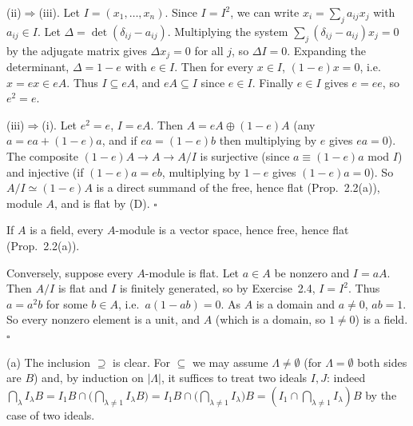 \documentclass[11pt]{article}
\begin{document}
(ii)$\Rightarrow$(iii). Let $I=(x_1,\dots,x_n)$. Since $I=I^2$, we can write $x_i=\sum_j a_{ij}x_j$ with $a_{ij}\in I$. Let $\Delta=\det(\delta_{ij}-a_{ij})$. Multiplying the system $\sum_j(\delta_{ij}-a_{ij})x_j=0$ by the adjugate matrix gives $\Delta x_j=0$ for all $j$, so $\Delta I=0$. Expanding the determinant, $\Delta=1-e$ with $e\in I$. Then for every $x\in I$, $(1-e)x=0$, i.e.\ $x=ex\in eA$. Thus $I\subseteq eA$, and $eA\subseteq I$ since $e\in I$. Finally $e\in I$ gives $e=ee$, so $e^2=e$.

(iii)$\Rightarrow$(i). Let $e^2=e$, $I=eA$. Then $A=eA\oplus(1-e)A$ (any $a=ea+(1-e)a$, and if $ea=(1-e)b$ then multiplying by $e$ gives $ea=0$). The composite $(1-e)A\to A\to A/I$ is surjective (since $a\equiv (1-e)a$ mod $I$) and injective (if $(1-e)a=eb$, multiplying by $1-e$ gives $(1-e)a=0$). So $A/I\simeq (1-e)A$ is a direct summand of the free, hence flat (Prop.~2.2(a)), module $A$, and is flat by (D). \hfill$\square$

\pf
If $A$ is a field, every $A$-module is a vector space, hence free, hence flat (Prop.~2.2(a)).

Conversely, suppose every $A$-module is flat. Let $a\in A$ be nonzero and $I=aA$. Then $A/I$ is flat and $I$ is finitely generated, so by Exercise~2.4, $I=I^2$. Thus $a=a^2b$ for some $b\in A$, i.e.\ $a(1-ab)=0$. As $A$ is a domain and $a\neq0$, $ab=1$. So every nonzero element is a unit, and $A$ (which is a domain, so $1\ne 0$) is a field. \hfill$\square$

\pf
(a) The inclusion $\supseteq$ is clear. For $\subseteq$ we may assume $\Lambda\neq\emptyset$ (for $\Lambda=\emptyset$ both sides are $B$) and, by induction on $|\Lambda|$, it suffices to treat two ideals $I,J$: indeed $\bigcap_{\lambda}I_\lambda B=I_1B\cap\bigl(\bigcap_{\lambda\ne1}I_\lambda B\bigr)=I_1B\cap\bigl(\bigcap_{\lambda\neq1}I_\lambda\bigr)B=(I_1\cap\bigcap_{\lambda\ne1}I_\lambda)B$ by the case of two ideals.
\end{document}
